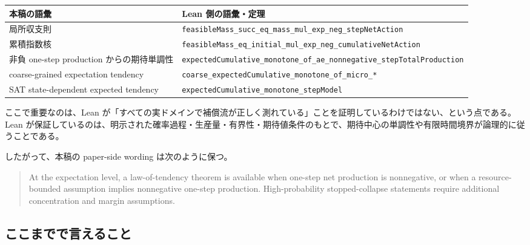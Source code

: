 \documentclass[12pt,a4paper]{article}
\begin{document}
{\def\LTcaptype{table} %
\begin{longtable}[]{@{}
  >{\raggedright\arraybackslash}p{}
  >{\raggedright\arraybackslash}p{}@{}}
\toprule\noalign{}
\begin{minipage}[b]{\linewidth}\raggedright
本稿の語彙
\end{minipage} & \begin{minipage}[b]{\linewidth}\raggedright
Lean 側の語彙・定理
\end{minipage} \\
\midrule\noalign{}
\endhead
\bottomrule\noalign{}
\endlastfoot
局所収支則 & \texttt{feasibleMass\_succ\_eq\_mass\_mul\_exp\_neg\_stepNetAction} \\
累積指数核 & \texttt{feasibleMass\_eq\_initial\_mul\_exp\_neg\_cumulativeNetAction} \\
非負 one-step production からの期待単調性 & \texttt{expectedCumulative\_monotone\_of\_ae\_nonnegative\_stepTotalProduction} \\
coarse-grained expectation tendency & \texttt{coarse\_expectedCumulative\_monotone\_of\_micro\_*} \\
SAT state-dependent expected tendency & \texttt{expectedCumulative\_monotone\_stepModel} \\
\end{longtable}
}

ここで重要なのは、Lean が「すべての実ドメインで補償流が正しく測れている」ことを証明しているわけではない、という点である。Lean が保証しているのは、明示された確率過程・生産量・有界性・期待値条件のもとで、期待中心の単調性や有限時間境界が論理的に従うことである。

したがって、本稿の paper-side wording は次のように保つ。

\begin{quote}
At the expectation level, a law-of-tendency theorem is available when one-step net production is nonnegative, or when a resource-bounded assumption implies nonnegative one-step production. High-probability stopped-collapse statements require additional concentration and margin assumptions.
\end{quote}

\subsection{ここまでで言えること}\label{ux3053ux3053ux307eux3067ux3067ux8a00ux3048ux308bux3053ux3068}
\end{document}
